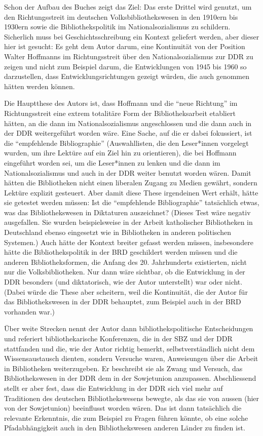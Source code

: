 \documentclass[a4paper,
fontsize=11pt,
oneside,
numbers=noperiodatend,
parskip=half-,
bibliography=totoc,
final
]{scrartcl}
\begin{document}
Schon der Aufbau des Buches zeigt das Ziel: Das erste Drittel wird
genutzt, um den Richtungsstreit im deutschen Volksbibliothekswesen in
den 1910ern bis 1930ern sowie die Bibliothekspolitik im
Nationalsozialismus zu schildern. Sicherlich muss bei
Geschichtsschreibung ein Kontext geliefert werden, aber dieser hier ist
gesucht: Es geht dem Autor darum, eine Kontinuität von der Position
Walter Hoffmanns im Richtungsstreit über den Nationalsozialismus zur DDR
zu zeigen und nicht zum Beispiel darum, die Entwicklungen von 1945 bis
1960 so darzustellen, dass Entwicklungsrichtungen gezeigt würden, die
auch genommen hätten werden können.

Die Hauptthese des Autors ist, dass Hoffmann und die \enquote{neue
Richtung} im Richtungsstreit eine extrem totalitäre Form der
Bibliotheksarbeit etabliert hätten, an die dann im Nationalsozialismus
angeschlossen und die dann auch in der DDR weitergeführt worden wäre.
Eine Sache, auf die er dabei fokussiert, ist die \enquote{empfehlende
Bibliographie} (Auswahllisten, die den Leser*innen vorgelegt wurden, um
ihre Lektüre auf ein Ziel hin zu orientieren), die bei Hoffmann
eingeführt worden sei, um die Leser*innen zu lenken und die dann im
Nationalsozialismus und auch in der DDR weiter benutzt worden wären.
Damit hätten die Bibliotheken nicht einen liberalen Zugang zu Medien
gewährt, sondern Lektüre explizit gesteuert. Aber damit diese These
irgendeinen Wert erhält, hätte sie getestet werden müssen: Ist die
\enquote{empfehlende Bibliographie} tatsächlich etwas, was das
Bibliothekswesen in Diktaturen auszeichnet? (Dieses Test wäre negativ
ausgefallen. Sie wurden beispielsweise in der Arbeit katholischer
Bibliotheken in Deutschland ebenso eingesetzt wie in Bibliotheken in
anderen politischen Systemen.) Auch hätte der Kontext breiter gefasst
werden müssen, insbesondere hätte die Bibliothekspolitik in der BRD
geschildert werden müssen und die anderen Bibliotheksformen, die Anfang
des 20. Jahrhunderts existierten, nicht nur die Volksbibliotheken. Nur
dann wäre sichtbar, ob die Entwicklung in der DDR besonders (und
diktatorisch, wie der Autor unterstellt) war oder nicht. (Dabei würde
die These aber scheitern, weil die Kontinuität, die der Autor für das
Bibliothekswesen in der DDR behauptet, zum Beispiel auch in der BRD
vorhanden war.)

Über weite Strecken nennt der Autor dann bibliothekspolitische
Entscheidungen und referiert bibliothekarische Konferenzen, die in der
SBZ und der DDR stattfanden und die, wie der Autor richtig bemerkt,
selbstverständlich nicht dem Wissensaustausch dienten, sondern Versuche
waren, Anweisungen über die Arbeit in Bibliotheken weiterzugeben. Er
beschreibt sie als Zwang und Versuch, das Bibliothekswesen in der DDR
dem in der Sowjetunion anzupassen. Abschliessend stellt er aber fest,
dass die Entwicklung in der DDR sich viel mehr auf Traditionen des
deutschen Bibliothekswesens bewegte, als das sie von aussen (hier von
der Sowjetunion) beeinflusst worden wären. Das ist dann tatsächlich die
relevante Erkenntnis, die zum Beispiel zu Fragen führen könnte, ob eine
solche Pfadabhängigkeit auch in den Bibliothekswesen anderen Länder zu
finden ist.
\end{document}
